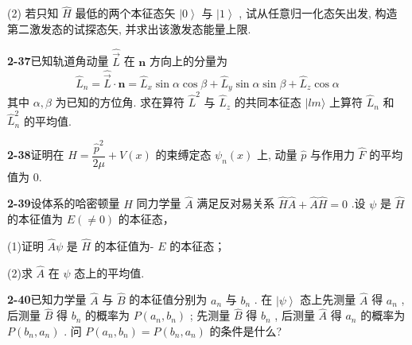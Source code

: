 (2) 若只知 $\displaystyle \hat{H}$ 最低的两个本征态矢 $\displaystyle \left|0\right\rangle$ 与 $\displaystyle \left|1\right\rangle$ , 试从任意归一化态矢出发, 构造第二激发态的试探态矢, 并求出该激发态能量上限.

\vfill

\newpage

\textbf{2-37}\quad 已知轨道角动量 $\displaystyle \hat{\vec{L}}$ 在 $\displaystyle \boldsymbol{n}$ 方向上的分量为
$$
\hat {L} _ {n} = \hat {\vec {L}} \cdot \boldsymbol {n} = \hat {L} _ {x} \sin \alpha \cos \beta + \hat {L} _ {y} \sin \alpha \sin \beta + \hat {L} _ {z} \cos \alpha
$$
其中 $\displaystyle \alpha, \beta$ 为已知的方位角. 求在算符 $\displaystyle \hat{L}^2$ 与 $\displaystyle \hat{L}_z$ 的共同本征态 $\displaystyle |lm\rangle$ 上算符 $\displaystyle \hat{L}_n$ 和 $\displaystyle \hat{L}_n^2$ 的平均值.

\vfill

\newpage

\textbf{2-38}\quad 证明在 $\displaystyle \hat{H} = \dfrac{\hat{p}^2}{2\mu} + V(x)$ 的束缚定态 $\displaystyle \psi_n(x)$ 上, 动量 $\displaystyle \hat{p}$ 与作用力 $\displaystyle \hat{F}$ 的平均值为 0.

\vfill

\newpage

\textbf{2-39}\quad 设体系的哈密顿量 $\displaystyle \hat{H}$ 同力学量 $\displaystyle \hat{A}$ 满足反对易关系 $\displaystyle \hat{H}\hat{A} +\hat{A}\hat{H} = 0$ .设 $\displaystyle \psi$ 是 $\displaystyle \hat{H}$ 的本征值为 $\displaystyle E(\neq 0)$ 的本征态，

(1)证明 $\displaystyle \hat{A}\psi$ 是 $\displaystyle \hat{H}$ 的本征值为- $\displaystyle E$ 的本征态；

(2)求 $\displaystyle \hat{A}$ 在 $\displaystyle \psi$ 态上的平均值.

\vfill

\newpage

\textbf{2-40}\quad 已知力学量 $\displaystyle \hat{A}$ 与 $\displaystyle \hat{B}$ 的本征值分别为 $\displaystyle a_{n}$ 与 $\displaystyle b_{n}$ . 在 $\displaystyle \left|\psi\right\rangle$ 态上先测量 $\displaystyle \hat{A}$ 得 $\displaystyle a_{n}$ , 后测量 $\displaystyle \hat{B}$ 得 $\displaystyle b_{n}$ 的概率为 $\displaystyle P(a_{n}, b_{n})$ ; 先测量 $\displaystyle \hat{B}$ 得 $\displaystyle b_{n}$ , 后测量 $\displaystyle \hat{A}$ 得 $\displaystyle a_{n}$ 的概率为 $\displaystyle P(b_{n}, a_{n})$ . 问 $\displaystyle P(a_{n}, b_{n}) = P(b_{n}, a_{n})$ 的条件是什么?

